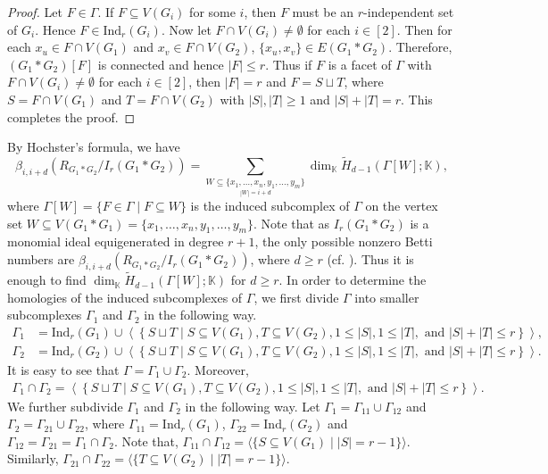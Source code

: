 \documentclass[12pt,reqno]{amsart}
\theoremstyle{definition}
\begin{document}
\begin{proof}
    Let $F\in \Gamma$. If $F\subseteq V(G_i)$ for some $i$, then $F$ must be an $r$-independent set of $G_i$. Hence $F\in \mathrm{Ind}_r(G_i)$. Now let $F\cap V(G_i)\neq\emptyset$ for each $i\in [2]$. Then for each $x_u\in F\cap V(G_1)$ and $x_v\in F\cap V(G_2)$, $\{x_u,x_v\}\in E(G_1*G_2)$. Therefore, $(G_1*G_2)[F]$ is connected and hence $|F|\le r$. Thus if $F$ is a facet of $\Gamma$ with $F\cap V(G_i)\neq\emptyset$ for each $i\in [2]$, then $|F|=r$ and $F=S\sqcup T$, where $S=F\cap V(G_1)$ and $T=F\cap V(G_2)$ with $|S|,|T|\ge 1$ and $|S|+|T|=r$. This completes the proof.
\end{proof}

By Hochster's formula, we have
{\footnotesize
\[
\beta_{i,i+d}(R_{G_1*G_2}/I_r(G_1*G_2))= \sum_{\underset{|W|=i+d}{W \subseteq\{x_1,\ldots,x_n,y_1,\ldots,y_m\} }} \dim_{\mathbb{K}} \widetilde{H}_{d-1}(\Gamma[W]; \mathbb{K}),
\]}
where $\Gamma[W]=\{F\in \Gamma\mid F\subseteq W\}$ is the induced subcomplex of $\Gamma$ on the vertex set $W\subseteq V(G_1*G_1)=\{x_1,\ldots,x_n,y_1,\ldots,y_m\}$. Note that as $I_r(G_1*G_2)$ is a monomial ideal equigenerated in degree $r+1$, the only possible nonzero Betti numbers are $\beta_{i,i+d}(R_{G_1*G_2}/I_r(G_1*G_2))$, where $d\ge r$ (cf. \cite[Proposition 12.3]{IP} ). Thus it is enough to find $\dim_{\mathbb K}\widetilde H_{d-1}(\Gamma[W];\mathbb K)$ for $d\ge r$. In order to determine the homologies of the induced subcomplexes of $\Gamma$, we first divide $\Gamma$ into smaller subcomplexes $\Gamma_1$ and $\Gamma_2$ in the following way.
{\footnotesize
\begin{align*}
    \Gamma_1&=\mathrm{Ind}_r(G_1)\cup \left\langle\left\{S\sqcup T\mid S\subseteq V(G_1), T\subseteq V(G_2), 1\le |S|, 1\le |T|,\text{ and } |S|+|T|\le r\right\}\right\rangle,\\
        \Gamma_2&=\mathrm{Ind}_r(G_2)\cup \left\langle\left\{S\sqcup T\mid S\subseteq V(G_1), T\subseteq V(G_2), 1\le |S|, 1\le |T|,\text{ and } |S|+|T|\le r\right\}\right\rangle.
\end{align*}}
It is easy to see that $\Gamma=\Gamma_1\cup\Gamma_2$. Moreover,
{\footnotesize
\begin{align*}
    \Gamma_1\cap\Gamma_2= \left\langle\left\{S\sqcup T\mid S\subseteq V(G_1), T\subseteq V(G_2),1\le |S|, 1\le |T|, \text{ and } |S|+|T|\le r\right\}\right\rangle.
\end{align*}
}
We further subdivide $\Gamma_1$ and $\Gamma_2$ in the following way. Let $\Gamma_1=\Gamma_{11}\cup \Gamma_{12}$ and $\Gamma_2=\Gamma_{21}\cup\Gamma_{22}$, where $\Gamma_{11}=\mathrm{Ind}_r(G_1)$, $\Gamma_{22}=\mathrm{Ind}_r(G_2)$ and $\Gamma_{12}=\Gamma_{21}=\Gamma_1\cap\Gamma_{2}$. Note that, $\Gamma_{11}\cap\Gamma_{12}=\langle \{S\subseteq V(G_1)\mid |S|=r-1\} \rangle$. Similarly, $\Gamma_{21}\cap\Gamma_{22}=\langle \{T\subseteq V(G_2)\mid |T|=r-1\} \rangle$.
\end{document}
